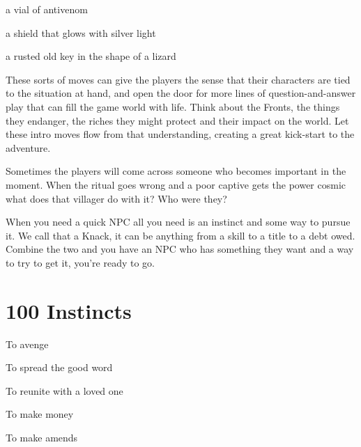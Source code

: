 \startitemize[1,packed]

\item a vial of antivenom

 
\item a shield that glows with silver light

 
\item a rusted old key in the shape of a lizard


\stopitemize
 

These sorts of moves can give the players the sense that their characters are tied to the situation at hand, and open the door for more lines of question-and-answer play that can fill the game world with life. Think about the Fronts, the things they endanger, the riches they might protect and their impact on the world. Let these intro moves flow from that understanding, creating a great kick-start to the adventure.

  





 



Sometimes the players will come across someone who becomes important in the moment. When the ritual goes wrong and a poor captive gets the power cosmic what does that villager do with it? Who were they?

 

When you need a quick NPC all you need is an instinct and some way to pursue it. We call that a Knack, it can be anything from a skill to a title to a debt owed. Combine the two and you have an NPC who has something they want and a way to try to get it, you're ready to go.

 
\section{100 Instincts}    
 
\startitemize[n,packed]

\item To avenge

 
\item To spread the good word

 
\item To reunite with a loved one

 
\item To make money

 
\item To make amends

